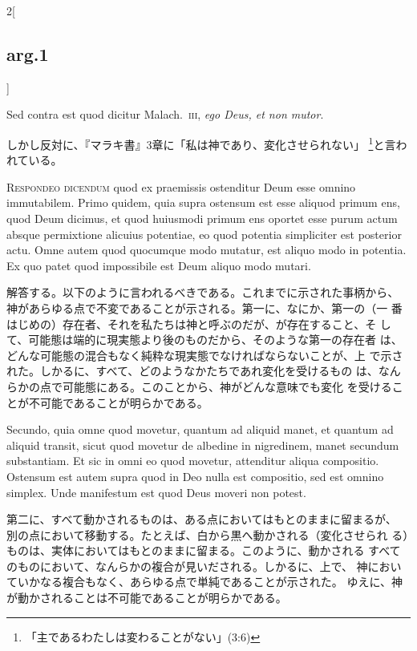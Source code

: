 \documentclass[paper=a4paper,fontsize=10pt,jafontsize=9pt,titlepage]{jlreq}
\begin{document}
\begin{paracol}{2}[\subsection{arg.1}]
\switchcolumn*

Sed contra est quod dicitur Malach.~{\scshape iii}, {\itshape ego
 Deus, et non mutor}.

\switchcolumn

しかし反対に、『マラキ書』3章に「私は神であり、変化させられない」
 \footnote{「主であるわたしは変わることがない」(3:6)}と言われている。


{\scshape Respondeo dicendum} quod ex praemissis ostenditur Deum esse
 omnino immutabilem. Primo quidem, quia supra ostensum est esse
 aliquod primum ens, quod Deum dicimus, et quod huiusmodi primum ens
 oportet esse purum actum absque permixtione alicuius potentiae, eo
 quod potentia simpliciter est posterior actu. Omne autem quod
 quocumque modo mutatur, est aliquo modo in potentia. Ex quo patet
 quod impossibile est Deum aliquo modo mutari.

\switchcolumn

解答する。以下のように言われるべきである。これまでに示された事柄から、
 神があらゆる点で不変であることが示される。第一に、なにか、第一の（一
 番はじめの）存在者、それを私たちは神と呼ぶのだが、が存在すること、そ
 して、可能態は端的に現実態より後のものだから、そのような第一の存在者
 は、どんな可能態の混合もなく純粋な現実態でなければならないことが、上
 で示された。しかるに、すべて、どのようなかたちであれ変化を受けるもの
 は、なんらかの点で可能態にある。このことから、神がどんな意味でも変化
 を受けることが不可能であることが明らかである。

\switchcolumn*

Secundo, quia omne quod movetur, quantum ad aliquid manet, et quantum
 ad aliquid transit, sicut quod movetur de albedine in nigredinem,
 manet secundum substantiam. Et sic in omni eo quod movetur,
 attenditur aliqua compositio. Ostensum est autem supra quod in Deo
 nulla est compositio, sed est omnino simplex. Unde manifestum est
 quod Deus moveri non potest.

\switchcolumn

第二に、すべて動かされるものは、ある点においてはもとのままに留まるが、
 別の点において移動する。たとえば、白から黒へ動かされる（変化させられ
 る）ものは、実体においてはもとのままに留まる。このように、動かされる
 すべてのものにおいて、なんらかの複合が見いだされる。しかるに、上で、
 神においていかなる複合もなく、あらゆる点で単純であることが示された。
 ゆえに、神が動かされることは不可能であることが明らかである。


\end{paracol}
\end{document}
